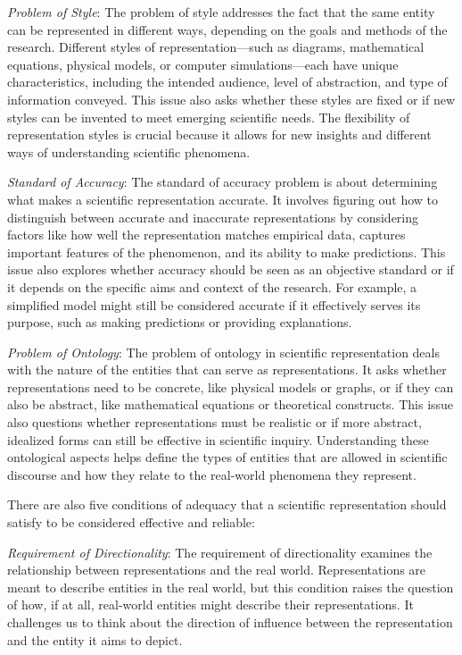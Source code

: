 \emph{Problem of Style}: The problem of style addresses the fact that the same entity can be represented in different ways, depending on the goals and methods of the research. Different styles of representation—such as diagrams, mathematical equations, physical models, or computer simulations—each have unique characteristics, including the intended audience, level of abstraction, and type of information conveyed. This issue also asks whether these styles are fixed or if new styles can be invented to meet emerging scientific needs. The flexibility of representation styles is crucial because it allows for new insights and different ways of understanding scientific phenomena.

\emph{Standard of Accuracy}: The standard of accuracy problem is about determining what makes a scientific representation accurate. It involves figuring out how to distinguish between accurate and inaccurate representations by considering factors like how well the representation matches empirical data, captures important features of the phenomenon, and its ability to make predictions. This issue also explores whether accuracy should be seen as an objective standard or if it depends on the specific aims and context of the research. For example, a simplified model might still be considered accurate if it effectively serves its purpose, such as making predictions or providing explanations.

\emph{Problem of Ontology}: The problem of ontology in scientific representation deals with the nature of the entities that can serve as representations. It asks whether representations need to be concrete, like physical models or graphs, or if they can also be abstract, like mathematical equations or theoretical constructs. This issue also questions whether representations must be realistic or if more abstract, idealized forms can still be effective in scientific inquiry. Understanding these ontological aspects helps define the types of entities that are allowed in scientific discourse and how they relate to the real-world phenomena they represent.

There are also five conditions of adequacy that a scientific representation should satisfy to be considered effective and reliable:

\emph{Requirement of Directionality}: The requirement of directionality examines the relationship between representations and the real world. Representations are meant to describe entities in the real world, but this condition raises the question of how, if at all, real-world entities might describe their representations. It challenges us to think about the direction of influence between the representation and the entity it aims to depict.

